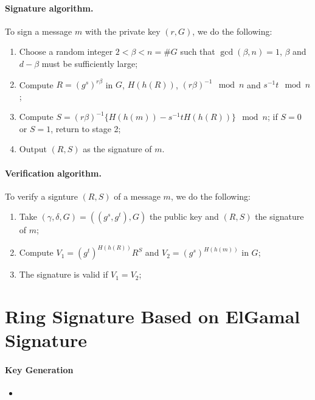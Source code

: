 \documentclass[a4paper,11pt]{article}
\begin{document}
\paragraph{Signature algorithm.}
    To sign a message $m$ with the private key $(r, G)$, we do the following:
\begin{enumerate}
    \item Choose a random integer $2<\beta< n=\#G$ such that $\gcd( \beta, n)=1$, $ \beta$ and $d - \beta$  must be sufficiently large;

    \item Compute $R=(g^{s})^{r  \beta}$ in $G$, $H(h(R))$, $(r  \beta)^{-1} \mod n$ and $ s^{-1}t \mod n$;

    \item Compute $S= (r  \beta)^{-1} \{H(h(m)) - s^{-1}tH(h(R))\} \mod n$; if $S=0$ or $S=1$, return to stage 2;

    \item Output $(R, S)$ as the signature of $m$.

\end{enumerate}

\paragraph{Verification algorithm.}
 To verify a signture $(R, S)$ of a message $m$, we do the following:
 
 \begin{enumerate}
    \item Take $(\gamma, \delta, G)=((g^{s},g^{t}), G)$ the public key and $(R, S)$ the signature of $m$;

    \item Compute $V_{1}= (g^{t})^{H(h(R))}R^{S} $  and  $V_{2}= (g^{s})^{H(h(m))}$  in $G$;

    \item The signature is valid if $V_{1}=V_{2}$;
 
\end{enumerate}

\section{Ring Signature Based on ElGamal Signature}\label{sec:three}

\paragraph{Key Generation}
    \begin{itemize}
      \item 
    \end{itemize}
\end{document}

